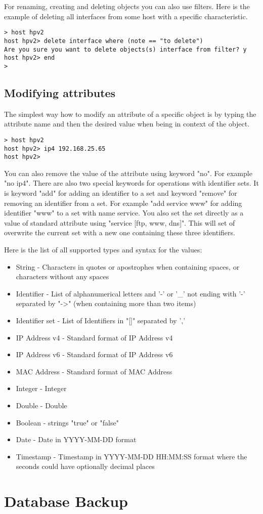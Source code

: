 \documentclass[deska]{subfiles}
\begin{document}
For renaming, creating and deleting objects you can also use filters. Here is the example of deleting all interfaces from
some host with a specific characteristic.

\begin{verbatim}
> host hpv2
host hpv2> delete interface where (note == "to delete")
Are you sure you want to delete objects(s) interface from filter? y
host hpv2> end
>
\end{verbatim}

\subsection{Modifying attributes}

The simplest way how to modify an attribute of a specific object is by typing the attribute name and then the desired value
when being in context of the object.

\begin{verbatim}
> host hpv2
host hpv2> ip4 192.168.25.65
host hpv2>
\end{verbatim}

You can also remove the value of the attribute using keyword "no". For example "no ip4". There are also two special
keywords for operations with identifier sets. It is keyword "add" for adding an identifier to a set and keyword
"remove" for removing an identifier from a set. For example "add service www" for adding identifier "www" to a set
with name service. You also set the set directly as a value of standard attribute using "service [ftp, www, dns]". This
will set of overwrite the current set with a new one containing these three identifiers.

Here is the list of all supported types and syntax for the values:

\begin{itemize}
    \item{String} - Characters in quotes or apostrophes when containing spaces, or characters without any spaces
    \item{Identifier} - List of alphanumerical letters and '-' or '\_' not ending with '-' separated by "->" (when containing
                        more than two items)
    \item{Identifier set} - List of Identifiers in "[]" separated by ','
    \item{IP Address v4} - Standard format of IP Address v4
    \item{IP Address v6} - Standard format of IP Address v6
    \item{MAC Address} - Standard format of MAC Address
    \item{Integer} - Integer
    \item{Double} - Double
    \item{Boolean} - strings "true" or "false"
    \item{Date} - Date in YYYY-MM-DD format
    \item{Timestamp} - Timestamp in YYYY-MM-DD HH:MM:SS format where the seconds could have optionally decimal places
\end{itemize} 

\section{Database Backup}
\label{sec:cli-db-backup}

\end{document}
